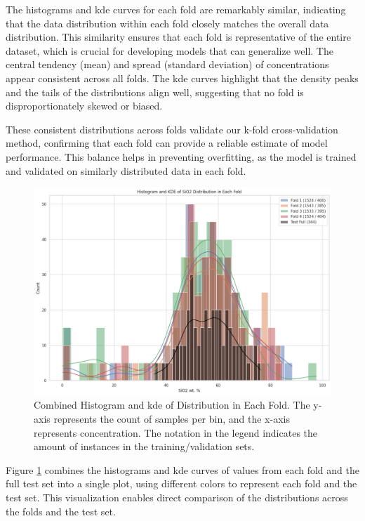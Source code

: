 The histograms and \gls{kde} curves for each fold are remarkably similar, indicating that the data distribution within each fold closely matches the overall data distribution.
This similarity ensures that each fold is representative of the entire dataset, which is crucial for developing models that can generalize well.
The central tendency (mean) and spread (standard deviation) of  concentrations appear consistent across all folds.
The \gls{kde} curves highlight that the density peaks and the tails of the distributions align well, suggesting that no fold is disproportionately skewed or biased.

These consistent distributions across folds validate our k-fold cross-validation method, confirming that each fold can provide a reliable estimate of model performance.
This balance helps in preventing overfitting, as the model is trained and validated on similarly distributed data in each fold.

\begin{figure}[h!]
    \centering
    \includegraphics[width=\textwidth]{images/histogram_kde_plot.png}
    \caption{Combined Histogram and \gls{kde} of  Distribution in Each Fold. The y-axis represents the count of samples per bin, and the x-axis represents  concentration. The notation in the legend indicates the amount of instances in the training/validation sets.}
    \label{fig:histogram_kde_plot}
\end{figure}

Figure \ref{fig:histogram_kde_plot} combines the histograms and \gls{kde} curves of  values from each fold and the full test set into a single plot, using different colors to represent each fold and the test set.
This visualization enables direct comparison of the distributions across the folds and the test set.

